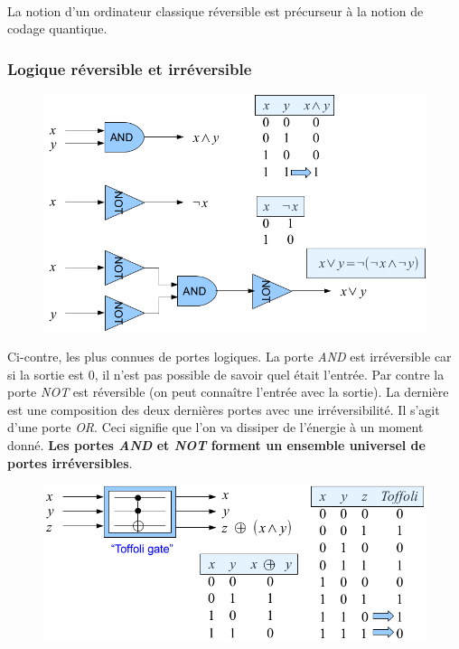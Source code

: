 \ 

La notion d'un ordinateur classique réversible est précurseur à la notion de codage quantique.




\subsubsection{Logique réversible et irréversible}
	\begin{figure}
	\vspace{-5mm}
	\includegraphics[scale=0.3]{ch1/image1.png}
	\end{figure}
Ci-contre, les plus connues de portes logiques. La porte \textit{AND} est irréversible car si 
la sortie est 0, il n'est pas possible de savoir quel était l'entrée. Par contre la porte
\textit{NOT} est réversible (on peut connaître l'entrée avec la sortie). La dernière est 
une composition des deux dernières portes avec une irréversibilité. Il s'agit d'une porte
\textit{OR}. Ceci signifie que l'on va dissiper de l'énergie à un moment donné. \textbf{Les portes
\textit{AND} et \textit{NOT} forment un ensemble universel de portes irréversibles}. \\

	\begin{figure}
	\includegraphics[scale=0.3]{ch1/image2.png}
	\end{figure}
	
